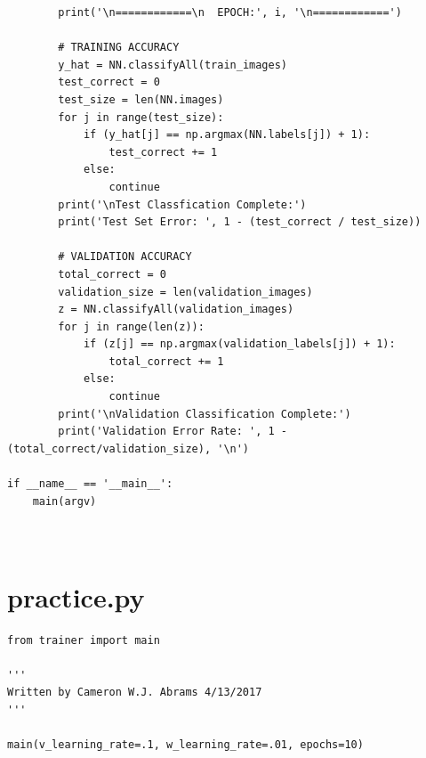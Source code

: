 \documentclass[12pt]{article}
\begin{document}
\begin{verbatim}
		print('\n============\n  EPOCH:', i, '\n============')

		# TRAINING ACCURACY
		y_hat = NN.classifyAll(train_images)
		test_correct = 0
		test_size = len(NN.images)
		for j in range(test_size):
			if (y_hat[j] == np.argmax(NN.labels[j]) + 1):
				test_correct += 1
			else:
				continue
		print('\nTest Classfication Complete:')
		print('Test Set Error: ', 1 - (test_correct / test_size))

		# VALIDATION ACCURACY
		total_correct = 0
		validation_size = len(validation_images)
		z = NN.classifyAll(validation_images)
		for j in range(len(z)):
			if (z[j] == np.argmax(validation_labels[j]) + 1):
				total_correct += 1
			else:
				continue
		print('\nValidation Classification Complete:')
		print('Validation Error Rate: ', 1 - (total_correct/validation_size), '\n')

if __name__ == '__main__':
	main(argv)
\end{verbatim}

\section{\\practice.py}
\begin{verbatim}
from trainer import main

'''
Written by Cameron W.J. Abrams 4/13/2017
'''

main(v_learning_rate=.1, w_learning_rate=.01, epochs=10)

\end{verbatim}

\newpage
\end{document}
